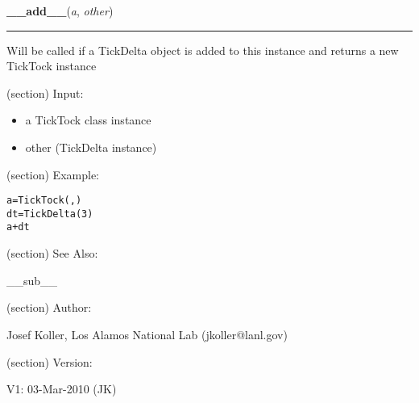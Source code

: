\hspace{.8\funcindent}\begin{boxedminipage}{\funcwidth}

    \raggedright \textbf{\_\_add\_\_}(\textit{a}, \textit{other})

    \vspace{-1.5ex}

    \rule{\textwidth}{0.5\fboxrule}
\setlength{\parskip}{2ex}
    Will be called if a TickDelta object is added to this instance and 
    returns a new TickTock instance

    (section) Input:

      \begin{itemize}
      \setlength{\parskip}{0.6ex}
        \item a TickTock class instance

        \item other (TickDelta instance)

      \end{itemize}

    (section) Example:

\begin{alltt}
\pysrcprompt{{\textgreater}{\textgreater}{\textgreater} }a = TickTock(, )
\pysrcprompt{{\textgreater}{\textgreater}{\textgreater} }dt = TickDelta(3)
\pysrcprompt{{\textgreater}{\textgreater}{\textgreater} }a + dt
\end{alltt}
    (section) See Also:

      \_\_sub\_\_

    (section) Author:

      Josef Koller, Los Alamos National Lab (jkoller@lanl.gov)

    (section) Version:

      V1: 03-Mar-2010 (JK)

\setlength{\parskip}{1ex}
    \end{boxedminipage}

    \label{spacepy:spacetime:TickTock:__getattr__}

    \vspace{0.5ex}

